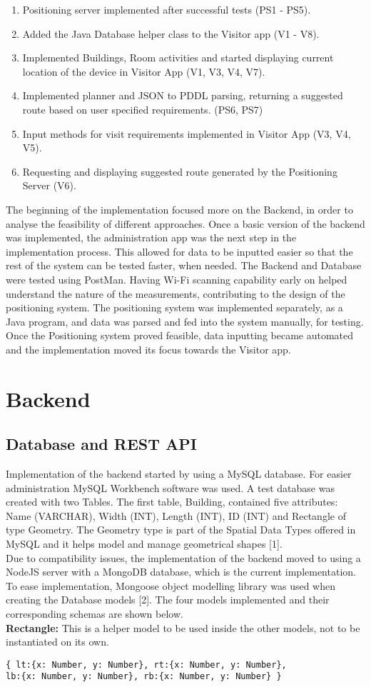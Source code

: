 \begin{enumerate}
	\item Positioning server implemented after successful tests (PS1 - PS5).
	\item Added the Java Database helper class to the Visitor app (V1 - V8).
	\item Implemented Buildings, Room activities and started displaying current location of the device in Visitor App (V1, V3, V4, V7).	
	\item Implemented planner and JSON to PDDL parsing, returning a suggested route based on user specified requirements. (PS6, PS7)
	\item Input methods for visit requirements implemented in Visitor App (V3, V4, V5).
	\item Requesting and displaying suggested route generated by the Positioning Server (V6).
\end{enumerate}
The beginning of the implementation focused more on the Backend, in order to analyse the feasibility of different approaches. Once a basic version of the backend was implemented, the administration app was the next step in the implementation process. This allowed for data to be inputted easier so that the rest of the system can be tested faster, when needed. The Backend and Database were tested using PostMan. Having Wi-Fi scanning capability early on helped understand the nature of the measurements, contributing to the design of the positioning system. The positioning system was implemented separately, as a Java program, and data was parsed and fed into the system manually, for testing. Once the Positioning system proved feasible, data inputting became automated and the implementation moved its focus towards the Visitor app.

\section{Backend}
\subsection{Database and REST API}
Implementation of the backend started by using a MySQL database. For easier administration MySQL Workbench software was used. A test database was created with two Tables. The first table, Building, contained five attributes: Name (VARCHAR), Width (INT), Length (INT), ID (INT) and Rectangle of type Geometry. The Geometry type is part of the Spatial Data Types offered in MySQL and it helps model and manage geometrical shapes [1].
\\
Due to compatibility issues, the implementation of the backend moved to using a NodeJS server with a MongoDB database, which is the current implementation.
To ease implementation, Mongoose object modelling library was used when creating the Database models [2]. The four models implemented and their corresponding schemas are shown below. 
\\
\textbf{Rectangle:}
This is a helper model to be used inside the other models, not to be instantiated on its own.
\begin{lstlisting}
{ lt:{x: Number, y: Number}, rt:{x: Number, y: Number}, 
lb:{x: Number, y: Number}, rb:{x: Number, y: Number} }	
\end{lstlisting}

